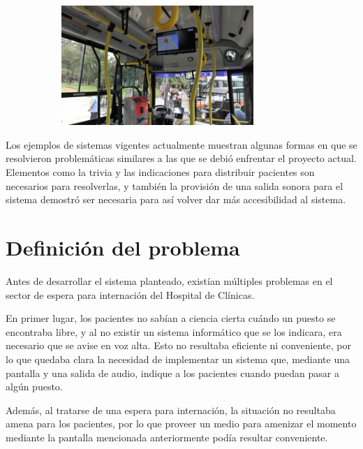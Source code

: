 \documentclass{article}
\begin{document}
\begin{figure}[H]
	\caption{Colectivo con pantalla que muestra información relevante}
    \begin{subfigure}{1.0\textwidth}
	\includegraphics[width=0.8\textwidth]{colectivo.png}
    \end{subfigure}
	\label{fig:colectivo}
\end{figure}
\vspace{-1.0\baselineskip}
Los ejemplos de sistemas vigentes actualmente muestran algunas formas en que se resolvieron problemáticas similares a las que se debió enfrentar el proyecto actual. Elementos como la trivia y las indicaciones para distribuir pacientes son necesarios para resolverlas, y también la provisión de una salida sonora para el sistema demostró ser necesaria para así volver dar más accesibilidad al sistema.
\section{Definición del problema}
Antes de desarrollar el sistema planteado, existían múltiples problemas en el sector de espera para internación del Hospital de Clínicas.

En primer lugar, los pacientes no sabían a ciencia cierta cuándo un puesto se encontraba libre, y al no existir un sistema informático que se los indicara, era necesario que se avise en voz alta. Esto no resultaba eficiente ni conveniente, por lo que quedaba clara la necesidad de implementar un sistema que, mediante una pantalla y una salida de audio, indique a los pacientes cuando puedan pasar a algún puesto.

Además, al tratarse de una espera para internación, la situación no resultaba amena para los pacientes, por lo que proveer un medio para amenizar el momento mediante la pantalla mencionada anteriormente podía resultar conveniente.
\end{document}
